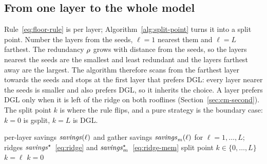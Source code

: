 \subsection{From one layer to the whole model}
\label{sec:cm-layers}

Rule~\eqref{eq:floor-rule} is per layer; Algorithm~\ref{alg:split-point} turns it into a split
point. Number the layers from the seeds, $\ell=1$ nearest them and $\ell=L$ farthest. The redundancy
$\rho$ grows with distance from the seeds, so the layers nearest the seeds are the smallest and
least redundant and the layers farthest away are the largest. The algorithm therefore scans from the
farthest layer towards the seeds and stops at the first layer that prefers DGL: every layer nearer
the seeds is smaller and also prefers DGL, so it inherits the choice. A layer prefers DGL only when
it is left of the ridge on both rooflines (Section~\ref{sec:cm-second}). The split point $k$ is
where the rule flips, and a pure strategy is the boundary case: $k=0$ is gsplit, $k=L$ is DGL.

\begin{algorithm}[h]
\caption{Choosing the split point $k$ of an $L$-layer model. Layers $1,\dots,k$ (nearest the
seeds) run data-parallel; layers $k{+}1,\dots,L$ run split.}
\label{alg:split-point}
\begin{algorithmic}[1]
\Require per-layer savings $\mathit{savings}(\ell)$ and gather savings $\mathit{savings}_{\mathit{m}}(\ell)$ for $\ell=1,\dots,L$;
         ridges $\mathit{savings}^\star$~\eqref{eq:ridge} and $\mathit{savings}_{\mathit{m}}^\star$~\eqref{eq:ridge-mem}
\Ensure split point $k\in\{0,\dots,L\}$
 
    \State \Return $k=\ell$ 
  \EndIf
\EndFor
\State \Return $k=0$ 
\end{algorithmic}
\end{algorithm}

